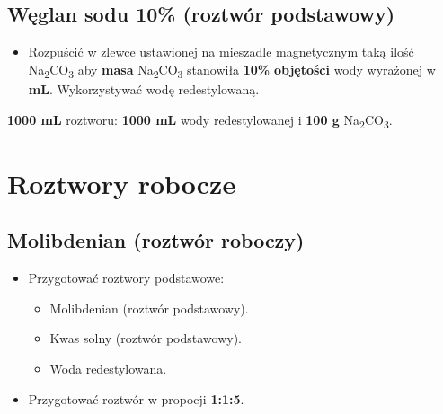 \documentclass[
  letterpaper,
  DIV=11,
  numbers=noendperiod]{scrreprt}
\providecommand{\tightlist}{%
  \setlength{\itemsep}{0pt}\setlength{\parskip}{0pt}}\usepackage{longtable,booktabs,array}
\begin{document}
\hypertarget{wux119glan-sodu-10-roztwuxf3r-podstawowy}{%
\subsection{Węglan sodu 10\% (roztwór
podstawowy)}\label{wux119glan-sodu-10-roztwuxf3r-podstawowy}}

\begin{itemize}
\tightlist
\item
  Rozpuścić w zlewce ustawionej na mieszadle magnetycznym taką ilość
  Na\textsubscript{2}CO\textsubscript{3} aby \textbf{masa}
  Na\textsubscript{2}CO\textsubscript{3} stanowiła \textbf{10\%}
  \textbf{objętości} wody wyrażonej w \textbf{mL}. Wykorzystywać wodę
  redestylowaną.
\end{itemize}

\begin{tcolorbox}[enhanced jigsaw, toptitle=1mm, bottomtitle=1mm, opacitybacktitle=0.6, colframe=quarto-callout-tip-color-frame, bottomrule=.15mm, title=\textcolor{quarto-callout-tip-color}{\faLightbulb}\hspace{0.5em}{Tip}, colbacktitle=quarto-callout-tip-color!10!white, left=2mm, breakable, rightrule=.15mm, colback=white, opacityback=0, arc=.35mm, coltitle=black, leftrule=.75mm, toprule=.15mm, titlerule=0mm]

\textbf{1000 mL} roztworu: \textbf{1000 mL} wody redestylowanej i
\textbf{100 g} Na\textsubscript{2}CO\textsubscript{3}.

\end{tcolorbox}

\hypertarget{roztwory-robocze}{%
\section{Roztwory robocze}\label{roztwory-robocze}}

\hypertarget{molibdenian-roztwuxf3r-roboczy}{%
\subsection{Molibdenian (roztwór
roboczy)}\label{molibdenian-roztwuxf3r-roboczy}}

\begin{itemize}
\tightlist
\item
  Przygotować roztwory podstawowe:

  \begin{itemize}
  \item
    Molibdenian (roztwór podstawowy).
  \item
    Kwas solny (roztwór podstawowy).
  \item
    Woda redestylowana.
  \end{itemize}
\item
  Przygotować roztwór w propocji \textbf{1:1:5}.
\end{itemize}
\end{document}
